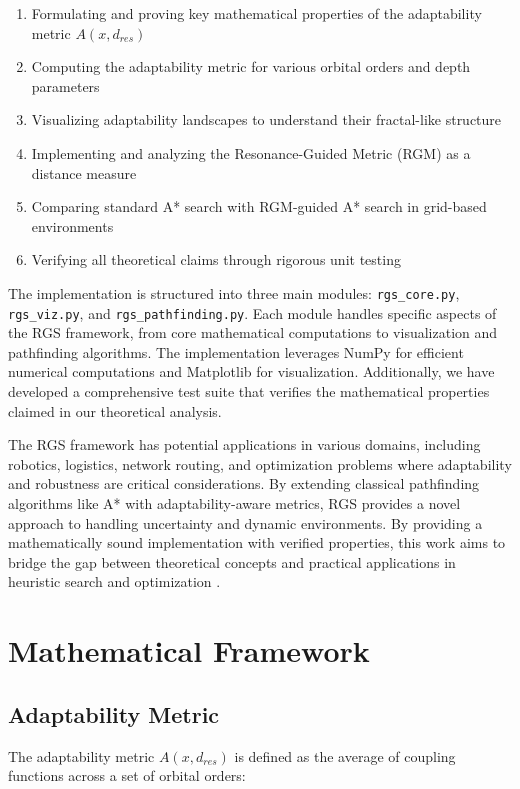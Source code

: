\documentclass{article}
\begin{document}
\begin{enumerate}
    \item Formulating and proving key mathematical properties of the adaptability metric $A(x, d_{res})$
    \item Computing the adaptability metric for various orbital orders and depth parameters
    \item Visualizing adaptability landscapes to understand their fractal-like structure
    \item Implementing and analyzing the Resonance-Guided Metric (RGM) as a distance measure
    \item Comparing standard A* search with RGM-guided A* search in grid-based environments
    \item Verifying all theoretical claims through rigorous unit testing
\end{enumerate}

The implementation is structured into three main modules: \texttt{rgs\_core.py}, \texttt{rgs\_viz.py}, and \texttt{rgs\_pathfinding.py}. Each module handles specific aspects of the RGS framework, from core mathematical computations to visualization and pathfinding algorithms. The implementation leverages NumPy \cite{numpy} for efficient numerical computations and Matplotlib \cite{matplotlib} for visualization. Additionally, we have developed a comprehensive test suite that verifies the mathematical properties claimed in our theoretical analysis.

The RGS framework has potential applications in various domains, including robotics, logistics, network routing, and optimization problems where adaptability and robustness are critical considerations. By extending classical pathfinding algorithms like A* \cite{astar} with adaptability-aware metrics, RGS provides a novel approach to handling uncertainty and dynamic environments. By providing a mathematically sound implementation with verified properties, this work aims to bridge the gap between theoretical concepts and practical applications in heuristic search and optimization \cite{heuristics}.

\section{Mathematical Framework}

\subsection{Adaptability Metric}
The adaptability metric $A(x, d_{res})$ is defined as the average of coupling functions across a set of orbital orders:
\end{document}
